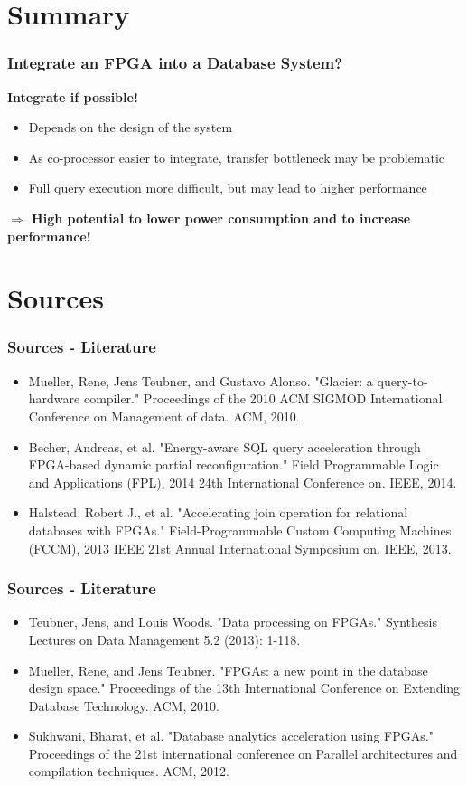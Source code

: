 \documentclass{beamer}
\begin{document}
\section{Summary}
\begin{frame}
	\frametitle{Integrate an FPGA into a Database System?}
	\textbf{Integrate if possible!}
	\begin{itemize}
		\item Depends on the design of the system
		\item As co-processor easier to integrate, transfer bottleneck may be problematic
		\item Full query execution more difficult, but may lead to higher performance 
	\end{itemize}
	\vspace*{0.5cm}
	\textbf{$\Rightarrow$ High potential to lower power consumption and to increase performance!}

\end{frame}

\section{Sources}
\begin{frame}
	\frametitle{Sources - Literature}
	\begin{itemize}
		\item Mueller, Rene, Jens Teubner, and Gustavo Alonso. "Glacier: a query-to-hardware compiler." Proceedings of the 2010 ACM SIGMOD International Conference on Management of data. ACM, 2010.
		\item Becher, Andreas, et al. "Energy-aware SQL query acceleration through FPGA-based dynamic partial reconfiguration." Field Programmable Logic and Applications (FPL), 2014 24th International Conference on. IEEE, 2014.
		\item Halstead, Robert J., et al. "Accelerating join operation for relational databases with FPGAs." Field-Programmable Custom Computing Machines (FCCM), 2013 IEEE 21st Annual International Symposium on. IEEE, 2013.
	\end{itemize}
\end{frame}
\begin{frame}
\frametitle{Sources - Literature}
\begin{itemize}
	\item Teubner, Jens, and Louis Woods. "Data processing on FPGAs." Synthesis Lectures on Data Management 5.2 (2013): 1-118.
	\item Mueller, Rene, and Jens Teubner. "FPGAs: a new point in the database design space." Proceedings of the 13th International Conference on Extending Database Technology. ACM, 2010.
	\item Sukhwani, Bharat, et al. "Database analytics acceleration using FPGAs." Proceedings of the 21st international conference on Parallel architectures and compilation techniques. ACM, 2012.
\end{itemize}
\end{frame}
\end{document}
